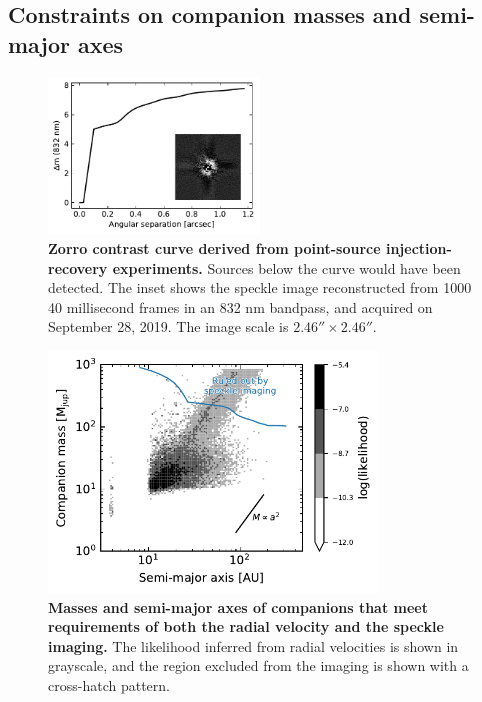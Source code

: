 \documentclass[12pt,twocolumn,tighten]{aastex62}
\begin{document}
\subsection{Constraints on companion masses and semi-major axes}

\begin{figure}[!t]
	\begin{center}
		\leavevmode
		\includegraphics[width=0.5\textwidth]{f3.pdf}
	\end{center}
	\vspace{-0.7cm}
    \caption{
      {\bf Zorro contrast curve derived from point-source
      injection-recovery experiments.}
      Sources below the curve would have been detected.
      The inset shows the speckle image reconstructed from 1000 40
      millisecond frames in an 832 nm bandpass, and acquired on
      September 28, 2019.  The image scale is $2.46''\times2.46''$.
    }
    \label{fig:zorro}
\end{figure}

\begin{figure}[t]
	\begin{center}
		\leavevmode
		\includegraphics[width=0.78\textwidth]{f4.pdf}
	\end{center}
	\vspace{-0.5cm}
	\caption{
    {\bf Masses and semi-major axes of companions that meet
    requirements of both the radial velocity and the speckle imaging.}
    The likelihood inferred from radial velocities is shown in
    grayscale, and the region excluded from the imaging is shown with
    a cross-hatch pattern.
	\label{fig:mass_sma}
  \vspace{-0.3cm}
	}
\end{figure}
\end{document}
